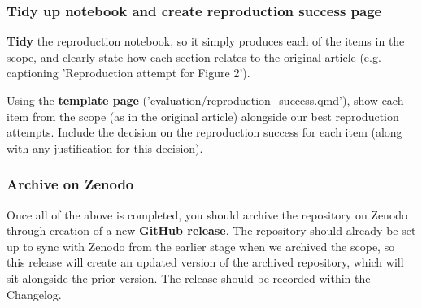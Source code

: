 \subsubsection{Tidy up notebook and create reproduction success page}

\textbf{Tidy} the reproduction notebook, so it simply produces each of the items in the scope, and clearly state how each section relates to the original article (e.g. captioning 'Reproduction attempt for Figure 2').

Using the \textbf{template page} ('evaluation/reproduction\_success.qmd'), show each item from the scope (as in the original article) alongside our best reproduction attempts. Include the decision on the reproduction success for each item (along with any justification for this decision).

\vspace{0.5cm}
\subsubsection{Archive on Zenodo}

Once all of the above is completed, you should archive the repository on Zenodo through creation of a new \textbf{GitHub release}. The repository should already be set up to sync with Zenodo from the earlier stage when we archived the scope, so this release will create an updated version of the archived repository, which will sit alongside the prior version. The release should be recorded within the Changelog.